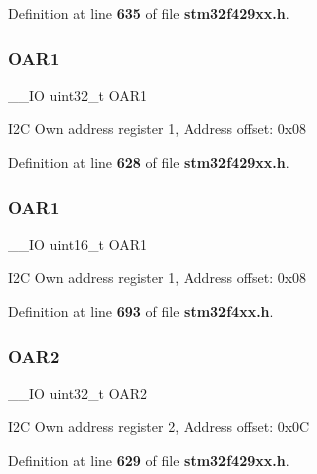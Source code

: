 Definition at line \textbf{ 635} of file \textbf{ stm32f429xx.\+h}.

\mbox{\label{structI2C__TypeDef_a08b4be0d626a00f26bc295b379b3bba6}} 
\subsubsection{O\+A\+R1\hspace{0.1cm}{\footnotesize\ttfamily [1/2]}}
{\footnotesize\ttfamily \+\_\+\+\_\+\+IO uint32\+\_\+t O\+A\+R1}

I2C Own address register 1, Address offset\+: 0x08 

Definition at line \textbf{ 628} of file \textbf{ stm32f429xx.\+h}.

\mbox{\label{structI2C__TypeDef_aaab934113da0a8bcacd1ffa148046569}} 
\subsubsection{O\+A\+R1\hspace{0.1cm}{\footnotesize\ttfamily [2/2]}}
{\footnotesize\ttfamily \+\_\+\+\_\+\+IO uint16\+\_\+t O\+A\+R1}

I2C Own address register 1, Address offset\+: 0x08 

Definition at line \textbf{ 693} of file \textbf{ stm32f4xx.\+h}.

\mbox{\label{structI2C__TypeDef_ab5c57ffed0351fa064038939a6c0bbf6}} 
\subsubsection{O\+A\+R2\hspace{0.1cm}{\footnotesize\ttfamily [1/2]}}
{\footnotesize\ttfamily \+\_\+\+\_\+\+IO uint32\+\_\+t O\+A\+R2}

I2C Own address register 2, Address offset\+: 0x0C 

Definition at line \textbf{ 629} of file \textbf{ stm32f429xx.\+h}.

\mbox{\label{structI2C__TypeDef_a692c0f6e38cde9ec1c3c50c36aa79817}} 
